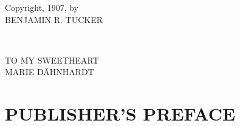 \documentclass[a4paper]{book}
\begin{document}
\begin{center}
Copyright, 1907, by\\
BENJAMIN R. TUCKER
\end{center}

\newpage{}

~

\vspace{200pt}

\begin{center}
TO MY SWEETHEART\\
MARIE D\"AHNHARDT
\end{center}

\medskip{}

\setcounter{secnumdepth}{-1}
\chapter[Publisher's Preface]{\centering PUBLISHER'S PREFACE}
\end{document}
